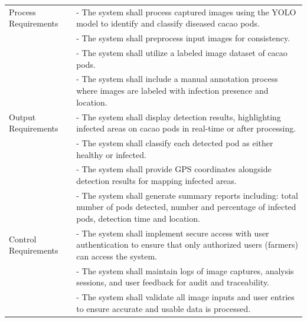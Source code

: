 \begin{longtable}{p{4cm} p{8cm}}
	Process Requirements     & - The system shall process captured images using the YOLO model to identify and classify diseased cacao pods.                                              \\
	                         & - The system shall preprocess input images for consistency.                                                                                                \\
	                         & - The system shall utilize a labeled image dataset of cacao pods.                                                                                          \\
	                         & - The system shall include a manual annotation process where images are labeled with infection presence and location.                                      \\
	\midrule

	Output Requirements      & - The system shall display detection results, highlighting infected areas on cacao pods in real-time or after processing.                                  \\
	                         & - The system shall classify each detected pod as either healthy or infected.                                                                               \\
	                         & - The system shall provide GPS coordinates alongside detection results for mapping infected areas.                                                         \\
	                         & - The system shall generate summary reports including: total number of pods detected, number and percentage of infected pods, detection time and location. \\
	\midrule

	Control Requirements     & - The system shall implement secure access with user authentication to ensure that only authorized users (farmers) can access the system.                  \\
	                         & - The system shall maintain logs of image captures, analysis sessions, and user feedback for audit and traceability.                                       \\
	                         & - The system shall validate all image inputs and user entries to ensure accurate and usable data is processed.                                             \\
	\midrule


\end{longtable}
